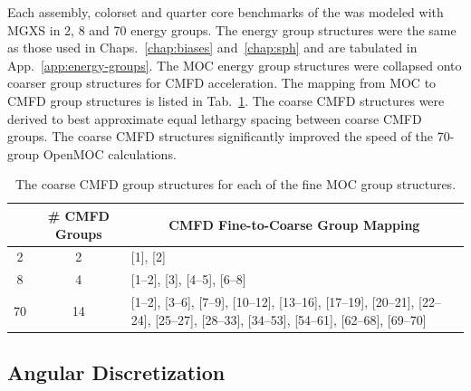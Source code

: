 Each assembly, colorset and quarter core benchmarks of the was modeled with \ac{MGXS} in 2, 8 and 70 energy groups. The energy group structures were the same as those used in Chaps.~\ref{chap:biases} and~\ref{chap:sph} and are tabulated in App.~\ref{app:energy-groups}. The \ac{MOC} energy group structures were collapsed onto coarser group structures for \ac{CMFD} acceleration. The mapping from \ac{MOC} to \ac{CMFD} group structures is listed in Tab.~\ref{table:chap8-coarse-cmfd-groups}. The coarse \ac{CMFD} structures were derived to best approximate equal lethargy spacing between coarse \ac{CMFD} groups. The coarse \ac{CMFD} structures significantly improved the speed of the 70-group OpenMOC calculations.

\begin{table}[h!]
  \centering
  \caption[Coarse \ac{CMFD} group structures]{The coarse \ac{CMFD} group structures for each of the fine \ac{MOC} group structures.}
  \small
  \label{table:chap8-coarse-cmfd-groups}
  \vspace{6pt}
  \begin{tabular}{p{1.5cm} p{1.5cm} p{7.2cm}}
  \toprule
  \rowcolor{lightgray}
  \multicolumn{1}{c}{\cellcolor{lightgray} \textbf{\# \ac{MOC} Groups}} &
  \multicolumn{1}{c}{\cellcolor{lightgray} \textbf{\# \ac{CMFD} Groups}} &
  \multicolumn{1}{c}{\cellcolor{lightgray} \textbf{\ac{CMFD} Fine-to-Coarse Group Mapping}} \\
  \midrule
  \multicolumn{1}{c}{2} & \multicolumn{1}{c}{2} & [1], [2] \\
  \midrule
  \multicolumn{1}{c}{8} & \multicolumn{1}{c}{4} & [1--2], [3], [4--5], [6--8] \\
  \midrule
  \multicolumn{1}{c}{70} & \multicolumn{1}{c}{14} & [1--2], [3--6], [7--9], [10--12], [13--16], \hspace{0.6cm} [17--19], [20--21], [22--24], [25--27], [28--33], [34--53], [54--61], [62--68], [69--70] \\ 
  \bottomrule
\end{tabular}
\end{table}

\subsection{Angular Discretization}
\label{subsec:chap8-angular-discretizations}

